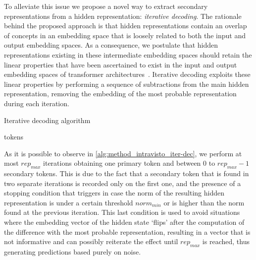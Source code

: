 To alleviate this issue we propose a novel way to extract secondary representations from a hidden representation: \emph{iterative decoding}.
The rationale behind the proposed approach is that hidden representations contain an overlap of concepts in an embedding space that is loosely related to both the input and output embedding spaces.
As a consequence, we postulate that hidden representations existing in these intermediate embedding spaces should retain the linear properties that have been ascertained to exist in the input and output embedding spaces of transformer architectures~\cite{mikolov2013,park2023}.
Iterative decoding exploits these linear properties by performing a sequence of subtractions from the main hidden representation, removing the embedding of the most probable representation during each iteration.
\begin{algorithm}
    \caption{Iterative decoding algorithm}\label{alg:method_intravisto_iter-dec}
    \begin{algorithmic}
            \ENDIF{}
            \ENDIF{}
        \ENDWHILE{}
        \RETURN tokens
    \end{algorithmic}
\end{algorithm}
As it is possible to observe in \cref{alg:method_intravisto_iter-dec}, we perform at most ${rep}_{max}$ iterations obtaining one primary token and between $0$ to ${rep}_{max} - 1$ secondary tokens.
This is due to the fact that a secondary token that is found in two separate iterations is recorded only on the first one, and the presence of a stopping condition that triggers in case the norm of the resulting hidden representation is under a certain threshold ${norm}_{min}$ or is higher than the norm found at the previous iteration.
This last condition is used to avoid situations where the embedding vector of the hidden state `flips' after the computation of the difference with the most probable representation, resulting in a vector that is not informative and can possibly reiterate the effect until ${rep}_{max}$ is reached, thus generating predictions based purely on noise. 

